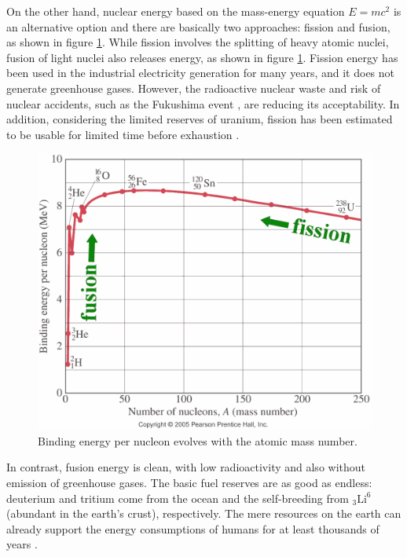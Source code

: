 On the other hand, nuclear energy based on the mass-energy equation $E = mc^2$ is an alternative option and there are basically two approaches: fission and fusion, as shown in figure \ref{fig:binding_energy}. While fission involves the splitting of heavy atomic nuclei, fusion of light nuclei also releases energy, as shown in  figure \ref{fig:binding_energy}. Fission energy has been used in the industrial electricity generation for many years, and it does not generate greenhouse gases. However, the radioactive nuclear waste and risk of nuclear accidents, such as the Fukushima event \cite{Bolsunovsky_2011_JER}, are reducing its acceptability. In addition, considering the limited reserves of uranium, fission has been estimated to be usable for limited time before exhaustion \cite{Dittmar_2013_STE}.


\begin{figure}[h]
\begin{centering}
\includegraphics[scale=0.25]{binding_energy.png}
\par\end{centering}
\caption{Binding energy per nucleon evolves with the atomic mass number.}
\label{fig:binding_energy}
\end{figure}


In contrast, fusion energy is clean, with low radioactivity \cite{Khvesyuk_2002_PPCF} and also without emission of greenhouse gases. The basic fuel reserves are as good as endless: deuterium and tritium come from the ocean and the self-breeding from $_3\mathrm{Li}^6$ (abundant in the earth's crust), respectively. The mere resources on the earth can already support the energy consumptions of humans for at least thousands of years \cite{Ongena_2012_FST}.


